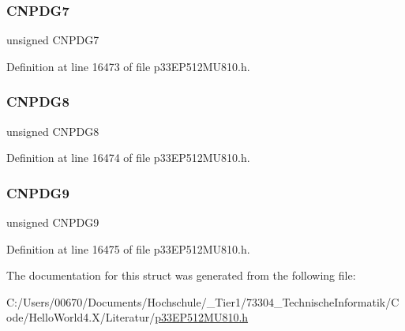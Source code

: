 \subsubsection{\texorpdfstring{C\+N\+P\+D\+G7}{CNPDG7}}
{\footnotesize\ttfamily unsigned C\+N\+P\+D\+G7}



Definition at line 16473 of file p33\+E\+P512\+M\+U810.\+h.

\mbox{\label{structtag_c_n_p_d_g_b_i_t_s_a741c5e7aca726568130f3c027ce8112a}} 
\subsubsection{\texorpdfstring{C\+N\+P\+D\+G8}{CNPDG8}}
{\footnotesize\ttfamily unsigned C\+N\+P\+D\+G8}



Definition at line 16474 of file p33\+E\+P512\+M\+U810.\+h.

\mbox{\label{structtag_c_n_p_d_g_b_i_t_s_a7af1bfd491d7a85b154412e07d6bd110}} 
\subsubsection{\texorpdfstring{C\+N\+P\+D\+G9}{CNPDG9}}
{\footnotesize\ttfamily unsigned C\+N\+P\+D\+G9}



Definition at line 16475 of file p33\+E\+P512\+M\+U810.\+h.



The documentation for this struct was generated from the following file\+:\begin{DoxyCompactItemize}
\item 
C\+:/\+Users/00670/\+Documents/\+Hochschule/\+\_\+\+Tier1/73304\+\_\+\+Technische\+Informatik/\+Code/\+Hello\+World4.\+X/\+Literatur/\hyperlink{p33_e_p512_m_u810_8h}{p33\+E\+P512\+M\+U810.\+h}\end{DoxyCompactItemize}
